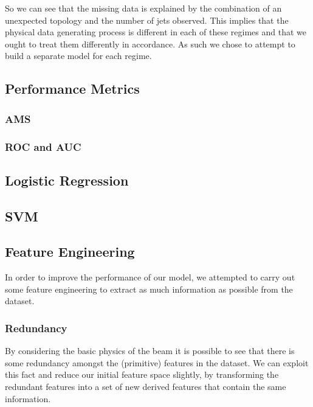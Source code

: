 So we can see that the missing data is explained by the combination of an unexpected topology and the number of jets observed. This implies that the physical data generating process is different in each of these regimes and that we ought to treat them differently in accordance. As such we chose to attempt to build a separate model for each regime. 

\subsection{Performance Metrics}
\subsubsection{AMS}

\subsubsection{ROC and AUC}

\subsection{Logistic Regression}

\subsection{SVM}

\subsection{Feature Engineering}
In order to improve the performance of our model, we attempted to carry out some feature engineering to extract as much information as possible from the dataset.

\subsubsection{Redundancy}
By considering the basic physics of the beam it is possible to see that there is some redundancy amongst the (primitive) features in the dataset. We can exploit this fact and reduce our initial feature space slightly, by transforming the redundant features into a set of new derived features that contain the same information. 

